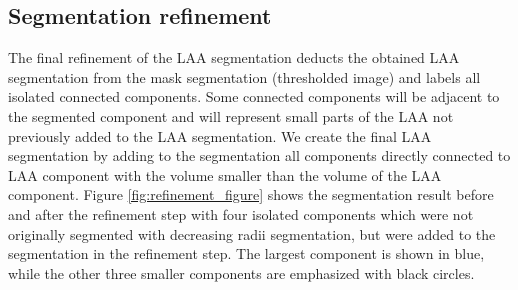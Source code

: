 \documentclass[review]{elsarticle}
\begin{document}
\subsection{Segmentation refinement}
\label{sec:final_seg}

The final refinement of the LAA segmentation deducts the obtained LAA
segmentation from the mask segmentation (thresholded image) and labels all
isolated connected components.
Some connected components will be adjacent to the segmented component and will
represent small parts of the LAA not previously added to the LAA segmentation. 
We create the final LAA segmentation by adding to the segmentation all
components directly connected to LAA component with the volume smaller than the
volume of the LAA component. Figure \ref{fig:refinement_figure} shows the
segmentation result before and after the refinement step with four isolated
components which were not originally segmented with decreasing radii
segmentation, but were added to the segmentation in the refinement step. The
largest component is shown in blue, while the other three smaller components
are emphasized with black circles.
\end{document}
